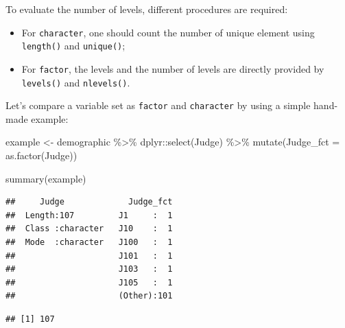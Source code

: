 \documentclass[
]{krantz}
\makeatletter
\newenvironment{Shaded}{\begin{snugshade}}{\end{snugshade}}
\newcommand{\AttributeTok}[1]{\textcolor[rgb]{0.61,0.61,0.61}{#1}}
\newcommand{\CommentTok}[1]{\textcolor[rgb]{0.37,0.37,0.37}{\textit{#1}}}
\newcommand{\FunctionTok}[1]{\textcolor[rgb]{0,0,0}{#1}}
\newcommand{\NormalTok}[1]{#1}
\newcommand{\OtherTok}[1]{\textcolor[rgb]{0.37,0.37,0.37}{#1}}
\newcommand{\SpecialCharTok}[1]{\textcolor[rgb]{0,0,0}{#1}}
\providecommand{\tightlist}{%
  \setlength{\itemsep}{0pt}\setlength{\parskip}{0pt}}
\newenvironment{kframe}{%
\medskip{}
\setlength{\fboxsep}{.8em}
 \def\at@end@of@kframe{}%
 \ifinner\ifhmode%
  \def\at@end@of@kframe{\end{minipage}}%
  \begin{minipage}{\columnwidth}%
 \fi\fi%
 \def\FrameCommand##1{\hskip\@totalleftmargin \hskip-\fboxsep
 \colorbox{shadecolor}{##1}\hskip-\fboxsep
     \hskip-\linewidth \hskip-\@totalleftmargin \hskip\columnwidth}%
 \MakeFramed {\advance\hsize-\width
   \@totalleftmargin\z@ \linewidth\hsize
   \@setminipage}}%
 {\par\unskip\endMakeFramed%
 \at@end@of@kframe}
\renewenvironment{Shaded}{\begin{kframe}}{\end{kframe}}
\makeatother
\begin{document}
To evaluate the number of levels, different procedures are required:

\begin{itemize}
\tightlist
\item
  For \texttt{character}, one should count the number of unique element using \texttt{length()} and \texttt{unique()};
\item
  For \texttt{factor}, the levels and the number of levels are directly provided by \texttt{levels()} and \texttt{nlevels()}.
\end{itemize}

Let's compare a variable set as \texttt{factor} and \texttt{character} by using a simple hand-made example:

\begin{Shaded}
\begin{Highlighting}[]
\NormalTok{example }\OtherTok{\textless{}{-}}\NormalTok{ demographic }\SpecialCharTok{\%\textgreater{}\%} 
\NormalTok{  dplyr}\SpecialCharTok{::}\FunctionTok{select}\NormalTok{(Judge) }\SpecialCharTok{\%\textgreater{}\%} 
  \FunctionTok{mutate}\NormalTok{(}\AttributeTok{Judge\_fct =} \FunctionTok{as.factor}\NormalTok{(Judge))}

\FunctionTok{summary}\NormalTok{(example)}
\end{Highlighting}
\end{Shaded}

\begin{verbatim}
##     Judge             Judge_fct  
##  Length:107         J1     :  1  
##  Class :character   J10    :  1  
##  Mode  :character   J100   :  1  
##                     J101   :  1  
##                     J103   :  1  
##                     J105   :  1  
##                     (Other):101
\end{verbatim}

\begin{Shaded}
\end{Shaded}

\begin{verbatim}
## [1] 107
\end{verbatim}

\begin{Shaded}
\end{Shaded}
\end{document}
